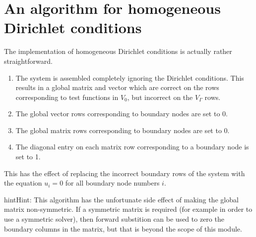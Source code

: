 \documentclass{book}
\begin{document}
\section{An algorithm for homogeneous Dirichlet conditions}
\label{\detokenize{7_boundary_conditions:an-algorithm-for-homogeneous-dirichlet-conditions}}
The implementation of homogeneous Dirichlet conditions is actually
rather straightforward.
\begin{enumerate}
\item {} 
The system is assembled completely ignoring the Dirichlet conditions.
This results in a global matrix and vector which are correct on the rows
corresponding to test functions in \(V_0\), but incorrect on the \(V_\Gamma\) rows.

\item {} 
The global vector rows corresponding to boundary nodes are set to 0.

\item {} 
The global matrix rows corresponding to boundary nodes are set to 0.

\item {} 
The diagonal entry on each matrix row corresponding to a boundary node is set to 1.

\end{enumerate}

This has the effect of replacing the incorrect boundary rows of the
system with the equation \(u_i = 0\) for all boundary node numbers \(i\).

\begin{sphinxadmonition}{hint}{Hint:}
This algorithm has the unfortunate side effect of making the global
matrix non-symmetric. If a symmetric matrix is required (for
example in order to use a symmetric solver), then forward
substition can be used to zero the boundary columns in the matrix,
but that is beyond the scope of this module.
\end{sphinxadmonition}
\end{document}
